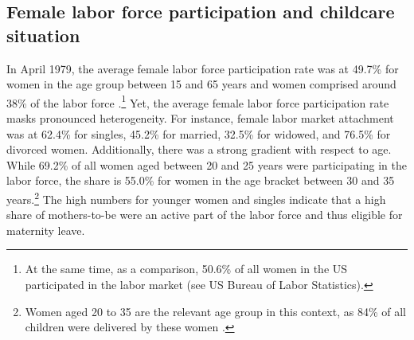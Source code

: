 \documentclass[11pt, a4paper,draft]{article} %
\begin{document}
\subsection{Female labor force participation and childcare situation}
In April 1979, the average female labor force participation rate was at 49.7\% for women in the age group between 15 and 65 years and women comprised around 38\% of the labor force \citep{federalstatisticaloffice1981yearbook}.\footnote{At the same time, as a comparison, 50.6\% of all women in the US participated in the labor market (see US Bureau of Labor Statistics).} Yet, the average female labor force participation rate masks pronounced heterogeneity. For instance, female labor market attachment was at 62.4\% for singles, 45.2\% for married, 32.5\% for widowed, and 76.5\% for divorced women. Additionally, there was a strong gradient with respect to age. While 69.2\% of all women aged between 20 and 25 years were participating in the labor force, the share is 55.0\% for women in the age bracket between 30 and 35 years.\footnote{Women aged 20 to 35 are the relevant age group in this context, as 84\% of all children were delivered by these women \citep{federalstatisticaloffice1981yearbook}.} The high numbers for younger women and singles indicate that a high share of mothers-to-be were an active part of the labor force and thus eligible for maternity leave. \newline 
\end{document}
